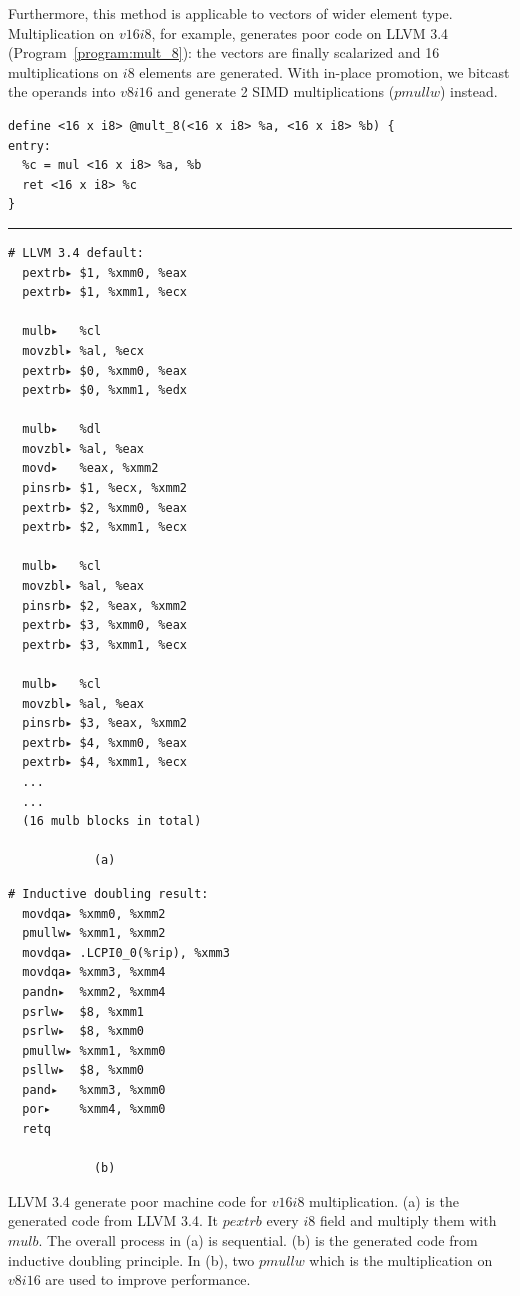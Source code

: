 Furthermore, this method is applicable to vectors of wider element type. Multiplication on $v16i8$, for example, generates poor code on LLVM 3.4 (Program~\ref{program:mult_8}): the vectors are finally scalarized and 16 multiplications on $i8$ elements are generated. With in-place promotion, we bitcast the operands into $v8i16$ and generate 2 SIMD multiplications ($pmullw$) instead.

\begin{program}
\begin{verbatim}
define <16 x i8> @mult_8(<16 x i8> %a, <16 x i8> %b) {
entry:
  %c = mul <16 x i8> %a, %b
  ret <16 x i8> %c
}
\end{verbatim}
\rule{\textwidth}{1pt}

\begin{multicols}{2}
\begin{verbatim}
# LLVM 3.4 default:
  pextrb▸ $1, %xmm0, %eax
  pextrb▸ $1, %xmm1, %ecx

  mulb▸   %cl
  movzbl▸ %al, %ecx
  pextrb▸ $0, %xmm0, %eax
  pextrb▸ $0, %xmm1, %edx

  mulb▸   %dl
  movzbl▸ %al, %eax
  movd▸   %eax, %xmm2
  pinsrb▸ $1, %ecx, %xmm2
  pextrb▸ $2, %xmm0, %eax
  pextrb▸ $2, %xmm1, %ecx

  mulb▸   %cl
  movzbl▸ %al, %eax
  pinsrb▸ $2, %eax, %xmm2
  pextrb▸ $3, %xmm0, %eax
  pextrb▸ $3, %xmm1, %ecx

  mulb▸   %cl
  movzbl▸ %al, %eax
  pinsrb▸ $3, %eax, %xmm2
  pextrb▸ $4, %xmm0, %eax
  pextrb▸ $4, %xmm1, %ecx
  ...
  ...
  (16 mulb blocks in total)

            (a)
\end{verbatim}
\columnbreak
\begin{verbatim}
# Inductive doubling result:
  movdqa▸ %xmm0, %xmm2
  pmullw▸ %xmm1, %xmm2
  movdqa▸ .LCPI0_0(%rip), %xmm3
  movdqa▸ %xmm3, %xmm4
  pandn▸  %xmm2, %xmm4
  psrlw▸  $8, %xmm1
  psrlw▸  $8, %xmm0
  pmullw▸ %xmm1, %xmm0
  psllw▸  $8, %xmm0
  pand▸   %xmm3, %xmm0
  por▸    %xmm4, %xmm0
  retq

            (b)
\end{verbatim}
\end{multicols}
\caption[Comparison of the compiled machine code of $v16i8$ multiplication between LLVM 3.4 and inductive doubling principle.]{LLVM 3.4 generate poor machine code for $v16i8$ multiplication. (a) is the generated code from LLVM 3.4. It $pextrb$ every $i8$ field and multiply them with $mulb$. The overall process in (a) is sequential. (b) is the generated code from inductive doubling principle. In (b), two $pmullw$ which is the multiplication on $v8i16$ are used to improve performance.}
\label{program:mult_8}
\end{program}

